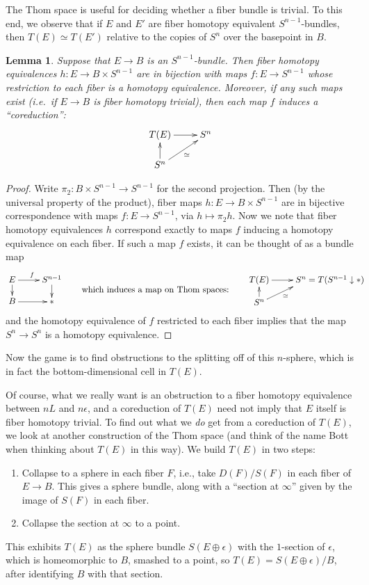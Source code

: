 \documentclass{article}
\newtheorem{lem}[thm]{Lemma}
\begin{document}
The Thom space is useful for deciding whether a fiber bundle is trivial.  To this end, we observe that if $E$ and $E'$ are fiber homotopy equivalent $S^{n-1}$-bundles, then $T(E) \simeq T(E')$ relative to the copies of $S^n$ over the basepoint in $B$.
\begin{lem}\label{LemOnFHTrivialisations}
Suppose that $E \to B$ is an $S^{n-1}$-bundle. Then fiber homotopy equivalences $h:E\to B\times S^{n-1}$ are in bijection with maps $f:E\to S^{n-1}$ whose restriction to each fiber is a homotopy equivalence. Moreover, if any such maps exist (i.e.\ if $E\to B$ is fiber homotopy trivial), then each map $f$ induces a ``coreduction'':
\[\xymatrix@R=.6cm{
T(E)\ar[r]&S^n\\
S^n\ar[u]\ar[ur]_\simeq
}\]
\end{lem}
\begin{proof}
Write $\pi_2:B\times S^{n-1}\to S^{n-1}$ for the second projection. Then (by the universal property of the product), fiber maps $h:E\to B\times S^{n-1}$ are in bijective correspondence with maps $f:E\to S^{n-1}$, via $h\mapsto \pi_2h$. Now we note that fiber homotopy equivalences $h$ correspond exactly to maps $f$ inducing a homotopy equivalence on each fiber. If such a map $f$ exists, it can be thought of as a bundle map
\[\xymatrix@R=.4cm{
E\ar[r]^f\ar[d]& S^{n-1}\ar[d]\\
B\ar[r]&\ast
}\raisebox{-.4cm}{\textup{\qquad which induces a map on Thom spaces:\qquad}}
\xymatrix@R=.4cm{
T(E)\ar[r]&S^n=\makebox[0cm][l]{$T(S^{n-1}\downarrow*)$}\\
S^n\ar[u]\ar[ur]_\simeq
}\qquad\qquad\]
and the homotopy equivalence of $f$ restricted to each fiber implies that the map $S^n\to S^n$ is a homotopy equivalence.
\end{proof}
\noindent Now the game is to find obstructions to the splitting off of this $n$-sphere, which is in fact the bottom-dimensional cell in $T(E)$.

Of course, what we really want is an obstruction to a fiber homotopy equivalence between $nL$ and $n \epsilon$, and a coreduction of $T(E)$ need not imply that $E$ itself is fiber homotopy trivial.  To find out what we \emph{do} get from a coreduction of $T(E)$, we look at another construction of the Thom space (and think of the name Bott when thinking about $T(E)$ in this way).  We build $T(E)$ in two steps:
\begin{enumerate}
\item Collapse to a sphere in each fiber $F$, i.e., take $D(F) / S(F)$ in each fiber of $E \to B$.  This gives a sphere bundle, along with a ``section at $\infty$'' given by the image of $S(F)$ in each fiber.
\item Collapse the section at $\infty$ to a point.
\end{enumerate}
This exhibits $T(E)$ as the sphere bundle $S(E \oplus \epsilon)$ with the $1$-section of $\epsilon$, which is homeomorphic to $B$, smashed to a point, so $T(E) = S(E \oplus \epsilon) / B$, after identifying $B$ with that section. %
\end{document}
